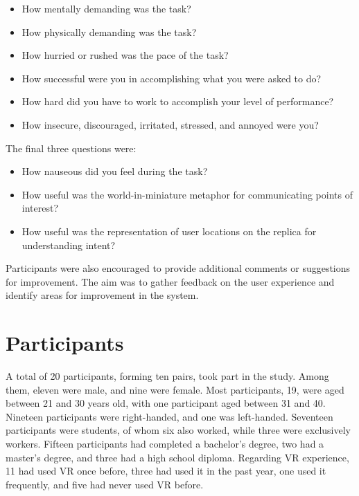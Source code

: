         \begin{itemize}
            \item How mentally demanding was the task?
            \item How physically demanding was the task?
            \item How hurried or rushed was the pace of the task?
            \item How successful were you in accomplishing what you were asked to do?
            \item How hard did you have to work to accomplish your level of performance?
            \item How insecure, discouraged, irritated, stressed, and annoyed were you?
        \end{itemize}

        The final three questions were:

        \begin{itemize}
            \item How nauseous did you feel during the task?
            \item How useful was the world-in-miniature metaphor for communicating points of interest?
            \item How useful was the representation of user locations on the replica for understanding intent?
        \end{itemize}

        Participants were also encouraged to provide additional comments or suggestions for improvement. The aim was to gather feedback on the user experience and identify areas for improvement in the system.

\section{Participants}

    A total of 20 participants, forming ten pairs, took part in the study. Among them, eleven were male, and nine were female. Most participants, 19, were aged between 21 and 30 years old, with one participant aged between 31 and 40. Nineteen participants were right-handed, and one was left-handed. Seventeen participants were students, of whom six also worked, while three were exclusively workers. Fifteen participants had completed a bachelor's degree, two had a master's degree, and three had a high school diploma. Regarding VR experience, 11 had used VR once before, three had used it in the past year, one used it frequently, and five had never used VR before.

